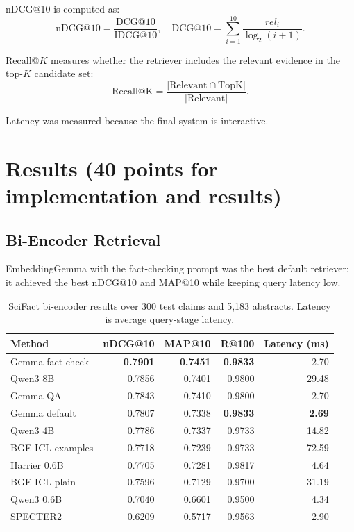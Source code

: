 \documentclass[11pt,a4paper]{article}
\begin{document}
nDCG@10 is computed as:
\begin{equation}
\mathrm{nDCG@10} = \frac{\mathrm{DCG@10}}{\mathrm{IDCG@10}},
\quad
\mathrm{DCG@10} = \sum_{i=1}^{10} \frac{rel_i}{\log_2(i+1)}.
\end{equation}

Recall@$K$ measures whether the retriever includes the relevant evidence in the top-$K$ candidate set:
\begin{equation}
\mathrm{Recall@K} = \frac{|\mathrm{Relevant} \cap \mathrm{TopK}|}{|\mathrm{Relevant}|}.
\end{equation}

Latency was measured because the final system is interactive.

\section{Results (40 points for implementation and results)}

\subsection{Bi-Encoder Retrieval}
EmbeddingGemma with the fact-checking prompt was the best default retriever: it achieved the best nDCG@10 and MAP@10 while keeping query latency low.

\begin{table}[H]
\centering
\small
\begin{tabular}{lrrrr}
\toprule
Method & nDCG@10 & MAP@10 & R@100 & Latency (ms) \\
\midrule
Gemma fact-check & \textbf{0.7901} & \textbf{0.7451} & \textbf{0.9833} & 2.70 \\
Qwen3 8B & 0.7856 & 0.7401 & 0.9800 & 29.48 \\
Gemma QA & 0.7843 & 0.7410 & 0.9800 & 2.70 \\
Gemma default & 0.7807 & 0.7338 & \textbf{0.9833} & \textbf{2.69} \\
Qwen3 4B & 0.7786 & 0.7337 & 0.9733 & 14.82 \\
BGE ICL examples & 0.7718 & 0.7239 & 0.9733 & 72.59 \\
Harrier 0.6B & 0.7705 & 0.7281 & 0.9817 & 4.64 \\
BGE ICL plain & 0.7596 & 0.7129 & 0.9700 & 31.19 \\
Qwen3 0.6B & 0.7040 & 0.6601 & 0.9500 & 4.34 \\
SPECTER2 & 0.6209 & 0.5717 & 0.9563 & 2.90 \\
\bottomrule
\end{tabular}
\caption{SciFact bi-encoder results over 300 test claims and 5,183 abstracts. Latency is average query-stage latency.}
\label{tab:biencoder-results}
\end{table}
\end{document}
